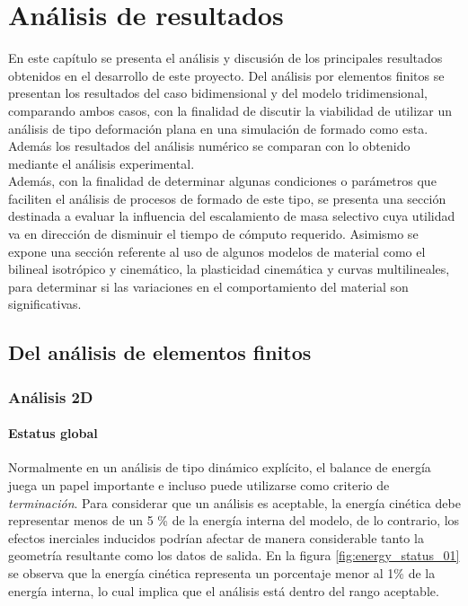 \chapter{Análisis de resultados}

En este capítulo se presenta el análisis y discusión de los principales resultados 
obtenidos en el desarrollo de este proyecto. Del análisis por elementos finitos 
se presentan los resultados del caso bidimensional y del modelo tridimensional, comparando 
ambos casos, con la finalidad de discutir la viabilidad de utilizar un análisis de tipo 
deformación plana en una simulación de formado como esta. Además los resultados del 
análisis numérico se comparan con lo obtenido mediante el análisis experimental.\\

Además, con la finalidad de determinar algunas condiciones o parámetros que faciliten 
el análisis de procesos de formado de este tipo, se presenta una sección destinada 
a evaluar la influencia del escalamiento de masa selectivo cuya utilidad va en 
dirección de disminuir el tiempo de cómputo requerido. Asimismo se expone una sección 
referente al uso de algunos modelos de material como el bilineal isotrópico y cinemático, 
la plasticidad cinemática y curvas multilineales, para determinar si las variaciones 
en el comportamiento del material son significativas.

\section{Del análisis de elementos finitos}

\subsection{Análisis 2D}

\subsubsection{Estatus global}

Normalmente en un análisis de tipo dinámico explícito, el balance de energía juega 
un papel importante e incluso puede utilizarse como criterio de \textit{terminación}. 
Para considerar que un análisis es aceptable, la energía cinética debe representar 
menos de un 5 \% de la energía interna del modelo, de lo contrario, los efectos 
inerciales inducidos podrían afectar de manera considerable tanto la geometría 
resultante como los datos de salida. En la figura \ref{fig:energy_status_01} se observa 
que la energía cinética representa un porcentaje menor al 1\% de la energía interna, lo 
cual implica que el análisis está dentro del rango aceptable. \\


